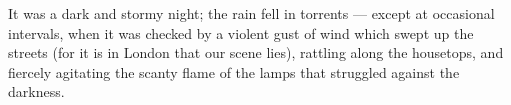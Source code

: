 
It was a dark and stormy night; the rain fell in torrents --- except at
occasional intervals, when it was checked by a violent gust of wind which
swept up the streets (for it is in London that our scene lies), rattling
along the housetops, and fiercely agitating the scanty flame of the lamps
that struggled against the darkness.

